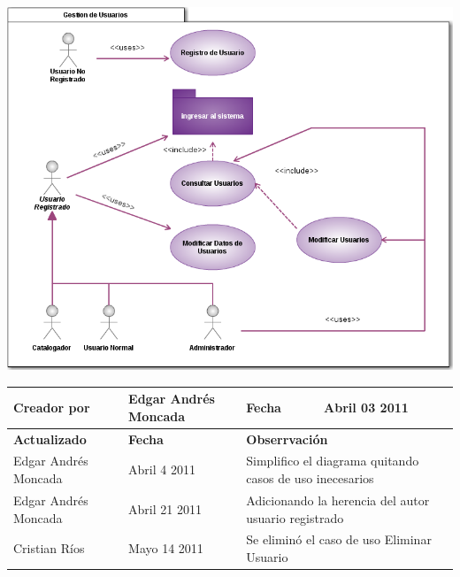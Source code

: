 
%
\begin{minipage}[c]{1\linewidth}
	\centering
    \includegraphics[scale=.6]{casosUso/CUGestionUsuarios}\\[0.5cm]
               
    \begin{tabular}{|p{}|p{}|p{}|p{}|}
    \hline
    {\bf Creador por} & {Edgar Andrés Moncada} & {\bf Fecha} & {Abril 03 2011}\\
    \hline
    \hline
    {\bf Actualizado}&{\bf Fecha}&\multicolumn{2}{p{0.45\textwidth}|}{\bf Obserrvación}\\
    \hline
    {Edgar Andrés Moncada}&{Abril 4 2011}&\multicolumn{2}{p{0.45\textwidth}|}{Simplifico el
    diagrama quitando casos de uso inecesarios}\\
    \hline
    {Edgar Andrés Moncada}&{Abril 21 2011}&\multicolumn{2}{p{0.45\textwidth}|}{Adicionando la
    herencia del autor usuario registrado}\\
    \hline	
    {Cristian Ríos}&{Mayo 14 2011}&\multicolumn{2}{p{0.45\textwidth}|}{Se eliminó el caso de uso Eliminar Usuario}\\
    \hline	
    \end{tabular}
\end{minipage}     

